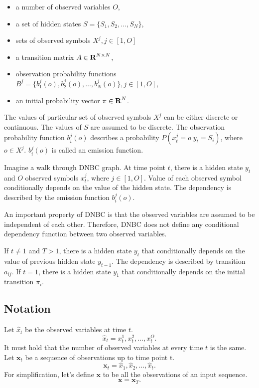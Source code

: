 \documentclass[thesis=B,english]{FITthesis}[2012/06/26]
\begin{document}
\begin{itemize}

\item{a number of observed variables $O$,}
\item a set of hidden states $S = \{S_1, S_2, \dots, S_N\}$,
\item{sets of observed symbols $X^j, j \in [1,O]$}
\item a transition matrix $A \in \textbf R^{N \times N}$,
\item observation probability functions $B^j = \{b_1^j(o), b_2^j(o), \dots, b_N^j(o)\}, j \in [1,O]$,
\item an initial probability vector $\pi \in \textbf R^N$.

\end{itemize}

The values of particular set of observed symbols $X^j$ can be either discrete or continuous. The values of $S$ are assumed to be discrete. The observation probability function $b_i^j(o)$ describes a probability $P(x^j_t=o|y_t=S_i)$, where $o \in X^j$. $b_i^j(o)$ is called an emission function.

Imagine a walk through DNBC graph. At time point $t$, there is a hidden state $y_t$ and $O$ observed symbols $x^j_t$, where $j \in [1,O]$. Value of each observed symbol conditionally depends on the value of the hidden state. The dependency is described by the emission function $b_i^j(o)$.

An important property of DNBC is that the observed variables are assumed to be independent of each other. Therefore, DNBC does not define any conditional dependency function between two observed variables.

If $t \neq 1$ and $T > 1$, there is a hidden state $y_t$ that conditionally depends on the value of previous hidden state $y_{t-1}$. The dependency is described by transition $a_{ij}$. If $t = 1$, there is a hidden state $y_1$ that conditionally depends on the initial transition $\pi_i$.

\subsection{Notation}
Let $\hat{x}_t$ be the observed variables at time $t$.
\begin{equation*}
\hat{x}_t = x_t^1, x_t^2, \dots, x_t^O.
\end{equation*}
It must hold that the number of observed variables at every time $t$ is the same.
Let $\textbf{x}_t$ be a sequence of observations up to time point t.
\begin{equation*}
\textbf{x}_t = \hat{x}_1, \hat{x}_2, \dots, \hat{x}_t.
\end{equation*}
For simplification, let's define $\textbf{x}$ to be all the observations of an input sequence.
\begin{equation*}
\textbf{x} = \textbf{x}_T.
\end{equation*}
\end{document}
